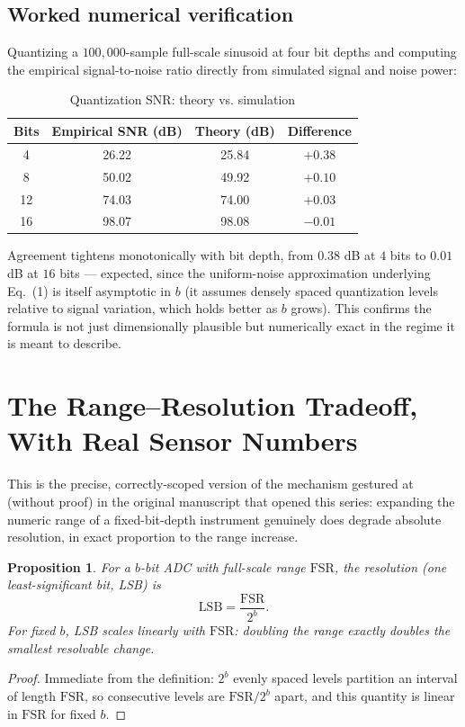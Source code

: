 \documentclass[10pt,journal,compsoc]{IEEEtran}
\newtheorem{proposition}{Proposition}
\begin{document}
\subsection{Worked numerical verification}
Quantizing a $100{,}000$-sample full-scale sinusoid at four bit depths and computing the empirical signal-to-noise ratio directly from simulated signal and noise power:

\begin{table}[h]
\centering
\caption{Quantization SNR: theory vs. simulation}
\begin{tabular}{cccc}
\toprule
\textbf{Bits} & \textbf{Empirical SNR (dB)} & \textbf{Theory (dB)} & \textbf{Difference} \\
\midrule
4  & 26.22 & 25.84 & $+0.38$ \\
8  & 50.02 & 49.92 & $+0.10$ \\
12 & 74.03 & 74.00 & $+0.03$ \\
16 & 98.07 & 98.08 & $-0.01$ \\
\bottomrule
\end{tabular}
\end{table}

Agreement tightens monotonically with bit depth, from $0.38$ dB at $4$ bits to $0.01$ dB at $16$ bits — expected, since the uniform-noise approximation underlying Eq.~(1) is itself asymptotic in $b$ (it assumes densely spaced quantization levels relative to signal variation, which holds better as $b$ grows). This confirms the formula is not just dimensionally plausible but numerically exact in the regime it is meant to describe.

\section{The Range--Resolution Tradeoff, With Real Sensor Numbers}
This is the precise, correctly-scoped version of the mechanism gestured at (without proof) in the original manuscript that opened this series: expanding the numeric range of a fixed-bit-depth instrument genuinely does degrade absolute resolution, in exact proportion to the range increase.

\begin{proposition}
For a $b$-bit ADC with full-scale range $\mathrm{FSR}$, the resolution (one least-significant bit, LSB) is
\begin{equation}
    \mathrm{LSB} = \frac{\mathrm{FSR}}{2^b}.
\end{equation}
For fixed $b$, LSB scales linearly with $\mathrm{FSR}$: doubling the range exactly doubles the smallest resolvable change.
\end{proposition}
\begin{proof}
Immediate from the definition: $2^b$ evenly spaced levels partition an interval of length $\mathrm{FSR}$, so consecutive levels are $\mathrm{FSR}/2^b$ apart, and this quantity is linear in $\mathrm{FSR}$ for fixed $b$.
\end{proof}
\end{document}
